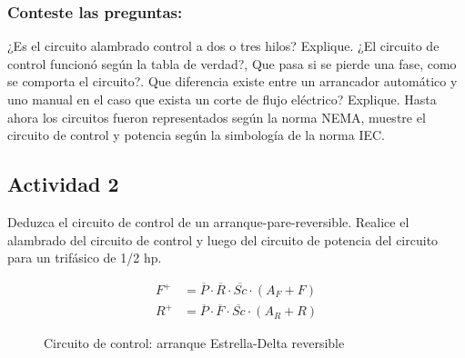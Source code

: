 \subsubsection{Conteste las preguntas:}

¿Es el circuito alambrado control a dos o tres hilos? Explique. ¿El circuito de control funcionó según la tabla de verdad?, Que pasa si se pierde una fase, como se comporta el circuito?. Que diferencia existe entre un arrancador automático y uno manual en el caso que exista un corte de flujo eléctrico? Explique.
 Hasta ahora los circuitos fueron representados según la norma NEMA, muestre el circuito de control y potencia según la simbología de la norma IEC.

\subsection{Actividad 2}

Deduzca el circuito de control de un arranque-pare-reversible. Realice el alambrado del circuito de control y luego del circuito de potencia del circuito para un trifásico de 1/2 hp.


\begin{align*}
    F^+ &= \overline{P} \cdot \overline{R} \cdot \overline{Sc} \cdot (A_F + F) \\
    R^+ &= \overline{P} \cdot \overline{F} \cdot \overline{Sc} \cdot (A_R + R)
\end{align*}

\begin{figure}[H]
    \centering
    \caption{Circuito de control: arranque Estrella-Delta reversible}
\end{figure}

